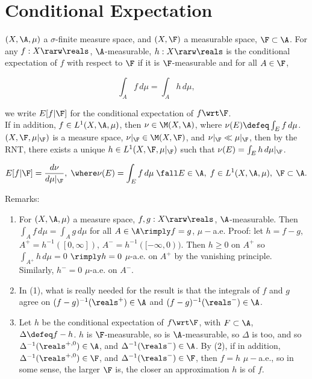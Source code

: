 











\section*{ Conditional Expectation }

$(X, \A, \mu)$ a $\sigma$-finite measure space, and $(X, \F)$ a measurable space, $\F \subset \A$. For any $f: X \rarw \reals$, $\A$-measurable, $h:X \rarw \reals$ is the conditional expectation of $f$ with respect to $\F$ if it is $\F$-measurable and for all $A \in \F$,

$$
\int_A f \, d\mu = \int_A h\, d\mu,
$$

\noindent we write $E[f|\F]$ for the conditional expectation of $f \wrt \F$. \\


\noindent
If in addition, $f \in L^1(X, \A, \mu)$, then $\nu \in \M(X, \A)$, where $\nu(E) \defeq \int_E f \, d\mu$. $(X, \F, \mu|_\F)$ is a measure space, $\nu|_\F \in \M(X, \F)$, and $ \nu|_\F \ll \mu|_\F$, then by the RNT, there exists a unique $h \in L^1(X, \F, \mu|_\F)$ such that $\nu(E) = \int_E h \, d\mu|_\F$.

$$
E[f|\F] = \frac{d \nu}{d\mu|_\F}, \; \where \nu(E) = \int_E f \, d\mu \; \fall E \in \A, \; f \in L^1(X, \A, \mu),\; \F \subset \A.
$$

Remarks:

\begin{enumerate}
\item
For $(X, \A, \mu)$ a measure space, $f,g: X \rarw \reals$, $\A$-measurable. Then $ \int_A f \,d\mu = \int_A g \, d\mu$ for all $A \in \A \rimply f = g$, $\mu-$a.e. Proof: let $h = f - g$, $A^+ = h^{-1}( [0,\infty] )$, $A^- = h^{-1}( [-\infty,0) )$. Then $h \ge 0$ on $A^+$ so $\int_{A^+} h \,d\mu = 0$ $\rimply h=0$ $\mu$-a.e. on $A^+$ by the vanishing principle. Similarly, $h^- = 0$ $\mu$-a.e. on $A^-$.
\item
In (1), what is really needed for the result is that the integrals of $f$ and $g$ agree on $(f-g)^{-1} (\reals^+) \in \A$ and $(f-g)^{-1} (\reals^-) \in \A$.
\item Let $h$ be the conditional expectation of $f \wrt \F$, with $F \subset \A$, $\Delta \defeq f-h$. $h$ is $\F$-measurable, so is $\A$-measurable, so $\Delta$ is too, and so $\Delta^{-1}(\reals^{+,0}) \in \A$, and $\Delta^{-1}(\reals^{-}) \in \A$. By (2), if in addition, $\Delta^{-1}(\reals^{+,0}) \in \F$, and $\Delta^{-1}(\reals^{-}) \in \F$, then $f=h$ $\mu-$a.e., so in some sense, the larger $\F$ is, the closer an approximation $h$ is of $f$.
\end{enumerate}





